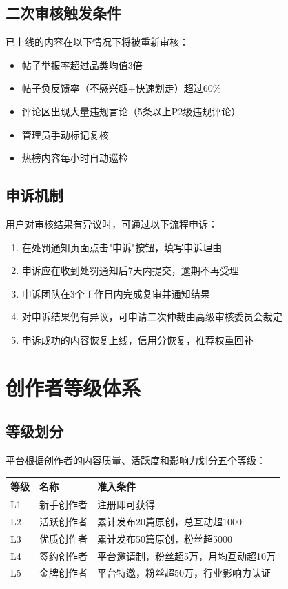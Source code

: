 \documentclass[a4paper,12pt]{article}
\begin{document}
\subsection{二次审核触发条件}

已上线的内容在以下情况下将被重新审核：

\begin{itemize}[noitemsep]
  \item 帖子举报率超过品类均值3倍
  \item 帖子负反馈率（不感兴趣+快速划走）超过60\%
  \item 评论区出现大量违规言论（5条以上P2级违规评论）
  \item 管理员手动标记复核
  \item 热榜内容每小时自动巡检
\end{itemize}

\subsection{申诉机制}

用户对审核结果有异议时，可通过以下流程申诉：

\begin{enumerate}[noitemsep]
  \item 在处罚通知页面点击"申诉"按钮，填写申诉理由
  \item 申诉应在收到处罚通知后7天内提交，逾期不再受理
  \item 申诉团队在3个工作日内完成复审并通知结果
  \item 对申诉结果仍有异议，可申请二次仲裁由高级审核委员会裁定
  \item 申诉成功的内容恢复上线，信用分恢复，推荐权重回补
\end{enumerate}

\section{创作者等级体系}

\subsection{等级划分}

平台根据创作者的内容质量、活跃度和影响力划分五个等级：

\begin{table}[h]
\centering
\begin{tabular}{llp{5cm}}
\toprule
\textbf{等级} & \textbf{名称} & \textbf{准入条件} \\
\midrule
L1 & 新手创作者 & 注册即可获得 \\
L2 & 活跃创作者 & 累计发布20篇原创，总互动超1000 \\
L3 & 优质创作者 & 累计发布50篇原创，粉丝超5000 \\
L4 & 签约创作者 & 平台邀请制，粉丝超5万，月均互动超10万 \\
L5 & 金牌创作者 & 平台特邀，粉丝超50万，行业影响力认证 \\
\bottomrule
\end{tabular}
\end{table}
\end{document}
